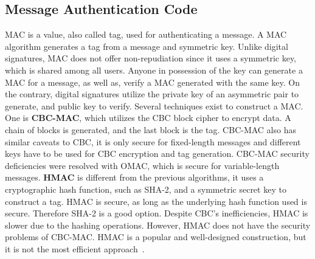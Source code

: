 

\subsection{Message Authentication Code}\label{chap:background:crypto:mac}

\ac{MAC} is a value, also called tag, used for authenticating a message.
A \ac{MAC} algorithm generates a tag from a message and symmetric key. Unlike digital signatures, \ac{MAC} does not offer non-repudiation since it uses a symmetric key, which is shared among all users. Anyone in possession of the key can generate a \ac{MAC} for a message, as well as, verify a MAC generated with the same key. On the contrary, digital signatures utilize the private key of an asymmetric pair to generate, and public key to verify.
Several techniques exist to construct a \ac{MAC}. One is \textbf{\ac{CBC-MAC}}, which utilizes the \ac{CBC} block cipher to encrypt data. A chain of blocks is generated, and the last block is the tag.
\ac{CBC-MAC} also has similar caveats to \ac{CBC}, it is only secure for fixed-length messages \cite{aesmodes} and different keys have to be used for \ac{CBC} encryption and tag generation. \ac{CBC-MAC} security deficiencies were resolved with \ac{OMAC}, which is secure for variable-length messages.
\textbf{\ac{HMAC}} is different from the previous algorithms, it uses a cryptographic hash function, such as SHA-2, and a symmetric secret key to construct a tag. \ac{HMAC} is secure, as long as the underlying hash function used is secure. Therefore SHA-2 is a good option.
Despite \ac{CBC}'s inefficiencies, \ac{HMAC} is slower due to the hashing operations. However, \ac{HMAC} does not have the security problems of \ac{CBC-MAC}. \ac{HMAC} is a popular and well-designed construction, but it is not the most efficient approach~\cite{aesmodes}.


